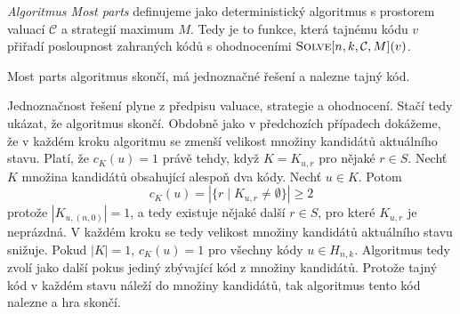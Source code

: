 \begin{definice}
    \emph{Algoritmus Most parts} definujeme jako deterministický algoritmus s prostorem valuací $\mathcal{C}$ a strategií maximum $M$. Tedy je to funkce, která tajnému kódu $v$ přiřadí posloupnost zahraných kódů s ohodnoceními $\textsc{Solve}[n, k, \mathcal{C}, M](v)$.
\end{definice}




\begin{tvrz}
    Most parts algoritmus skončí, má jednoznačné řešení a nalezne tajný kód.
\end{tvrz}
\begin{dukaz}
    Jednoznačnost řešení plyne z předpisu valuace, strategie a ohodnocení. Stačí tedy ukázat, že algoritmus skončí. Obdobně jako v předchozích případech dokážeme, že v každém kroku algoritmu se zmenší velikost množiny kandidátů aktuálního stavu. Platí, že $c_K(u) = 1$ právě tehdy, když $K = K_{u,r}$ pro nějaké $r \in S$. Nechť $K$ množina kandidátů obsahující alespoň dva kódy. Nechť $u \in K$. Potom 
    \[c_K(u) = |\{r \mid K_{u,r} \neq \emptyset\}| \geq 2\]
    protože $|K_{u,(n,0)}| = 1$, a tedy existuje nějaké další $r \in S$, pro které $K_{u,r}$ je neprázdná. V každém kroku se tedy velikost množiny kandidátů aktuálního stavu snižuje. Pokud $|K| = 1$, $c_K(u) = 1$ pro všechny kódy $u \in H_{n,k}$. Algoritmus tedy zvolí jako další pokus jediný zbývající kód z množiny kandidátů. Protože tajný kód v každém stavu náleží do množiny kandidátů, tak algoritmus tento kód nalezne a hra skončí.
\end{dukaz}


